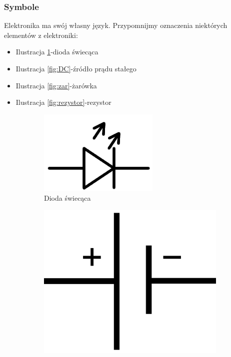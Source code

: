 \documentclass[a4paper,12pt, twoside]{article}
\begin{document}
	\subsubsection {Symbole}
	Elektronika ma swój własny język. Przypomnijmy oznaczenia niektórych elementów z elektroniki:
\begin{itemize}
	\item Ilustracja \ref{fig:dioda}-dioda świecąca
	\item Ilustracja \ref{fig:DC}-źródło prądu stałego
	\item Ilustracja \ref{fig:zar}-żarówka
	\item Ilustracja \ref{fig:rezystor}-rezystor
\end{itemize}
\begin{figure}
	\centering
	\begin{subfigure}[h!]{0.25\textwidth}
      \centering
      \includegraphics[scale=0.3]{dioda_swiec.png}
      \caption{Dioda świecąca}
			\label{fig:dioda}
   \end{subfigure}
	\begin{subfigure}[h]{0.25\textwidth}
      \centering
      \includegraphics[scale=0.05]{DC-Source.png}

\end{subfigure}
\end{figure}
\end{document}
